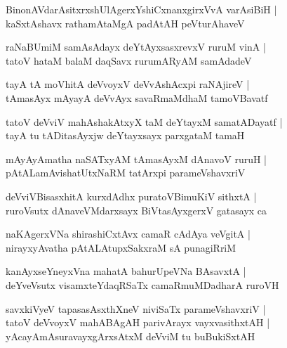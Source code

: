 \begin{shloka}
BinonAVdarAsitxrxshUlAgerxYshiCxnanxgirxVvA varAsiBiH |\\kaSxtAshavx rathamAtaMgA padAtAH peVturAhaveV 
\end{shloka}

\begin{shloka}
raNaBUmiM samAsAdayx deYtAyxsasxrevxV ruruM vinA |\\
tatoV hataM balaM daqSavx rurumARyAM samAdadeV 
\end{shloka}

\begin{shloka}
tayA tA moVhitA deVvoyxV deVvAshAcxpi raNAjireV |\\ tAmasAyx mAyayA deVvAyx savaRmaMdhaM tamoVBavatf
\end{shloka}

\begin{shloka}
tatoV deVviV mahAshakAtxyX taM deYtayxM samatADayatf |\\ tayA tu tADitasAyxjw deYtayxsayx parxgataM tamaH 
\end{shloka}

\begin{shloka}
mAyAyAmatha naSATxyAM tAmasAyxM dAnavoV ruruH |\\
pAtALamAvishatUtxNaRM tatArxpi parameVshavxriV
\end{shloka}

\begin{shloka}
deVviVBisasxhitA kurxdAdhx puratoVBimuKiV sithxtA |\\
ruroVsutx dAnaveVMdarxsayx BiVtasAyxgerxV gatasayx ca 
\end{shloka}

\begin{shloka}
naKAgerxVNa shirashiCxtAvx camaR cAdAya veVgitA |\\
nirayxyAvatha pAtALAtupxSakxraM sA punagiRriM
\end{shloka}

\begin{shloka}
kanAyxseYneyxVna mahatA bahurUpeVNa BAsavxtA |\\
deYveVsutx visamxteYdaqRSaTx camaRmuMDadharA ruroVH
\end{shloka}

\begin{shloka}
savxkiVyeV tapasasAsxthXneV niviSaTx parameVshavxriV |\\
tatoV deVvoyxV mahABAgAH parivArayx vayxvasithxtAH |\\
yAcayAmAsuravayxgArxsAtxM deVviM tu buBukiSxtAH
\end{shloka}

